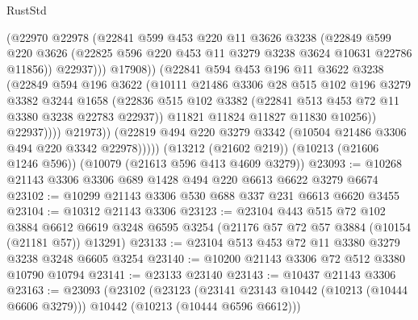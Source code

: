 \begin{lexlean}{RustStd}
\begin{coremodule}
                          (@22970
                            @22978
                            (@22841
                              @599
                              @453
                              @220
                              @11
                              @3626
                              @3238
                              (@22849
                                @599
                                @220
                                @3626
                                (@22825 @596 @220 @453 @11 @3279 @3238 @3624 @10631 @22786 @11856))
                              @22937)))
                        @17908))
                    (@22841
                      @594
                      @453
                      @196
                      @11
                      @3622
                      @3238
                      (@22849
                        @594
                        @196
                        @3622
                        (@10111
                          @21486
                          @3306
                          @28
                          @515
                          @102
                          @196
                          @3279
                          @3382
                          @3244
                          @1658
                          (@22836
                            @515
                            @102
                            @3382
                            (@22841 @513 @453 @72 @11 @3380 @3238 @22783 @22937))
                          @11821
                          @11824
                          @11827
                          @11830
                          @10256))
                      @22937))))
              @21973))
          (@22819 @494 @220 @3279 @3342 (@10504 @21486 @3306 @494 @220 @3342 @22978)))))
    (@13212 (@21602 @219))
    (@10213 (@21606 @1246 @596))
    (@10079 (@21613 @596 @413 @4609 @3279))
@23093 := @10268 @21143 @3306 @3306 @689 @1428 @494 @220 @6613 @6622 @3279 @6674
@23102 := @10299 @21143 @3306 @530 @688 @337 @231 @6613 @6620 @3455
@23104 := @10312 @21143 @3306
@23123 := @23104
    @443
    @515
    @72
    @102
    @3884
    @6612
    @6619
    @3248
    @6595
    @3254
    (@21176 @57 @72 @57 @3884 (@10154 (@21181 @57)) @13291)
@23133 := @23104 @513 @453 @72 @11 @3380 @3279 @3238 @3248 @6605 @3254
@23140 := @10200 @21143 @3306 @72 @512 @3380 @10790 @10794
@23141 := @23133 @23140
@23143 := @10437 @21143 @3306
@23163 := @23093
    (@23102
      (@23123
        (@23141 @23143 @10442 (@10213 (@10444 @6606 @3279)))
        @10442
        (@10213 (@10444 @6596 @6612)))

\end{coremodule}
\end{lexlean}

